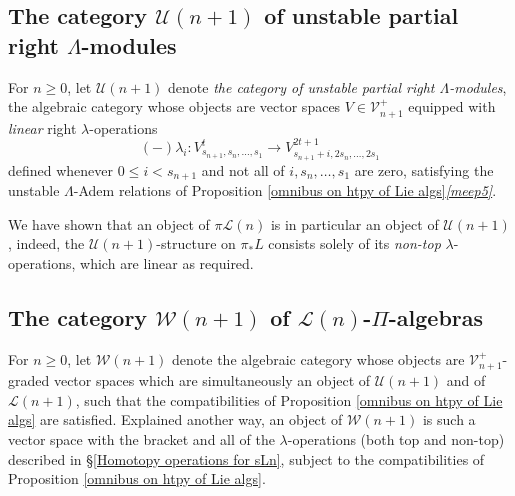 \documentclass[11pt]{amsart} \renewcommand{\baselinestretch}{1.2}
\theoremstyle{plain}
\newtheorem{prop}[thm]{Proposition}
\numberwithin{equation}{section} %
\theoremstyle{plain}
\newtheorem{prop}[thm]{Proposition}
\numberwithin{equation}{chapter} %
\newcommand{\DASH}{\mathrm{-}}
\renewcommand{\to}{\longrightarrow}
\newcommand{\calU}{\mathcal{U}}
\newcommand{\calL}{\mathcal{L}}
\newcommand{\calV}{\mathcal{V}}
\newcommand{\calw}{\mathcal{W}}
\newcommand{\vect}[2]{\calV^{#1}_{#2}}
\newcommand{\PA}[1]{\pi#1}
\newcommand{\SubsectionOrSection}[1]{\subsection{#1}}
\begin{document}
\begin{homotopy operations for PRLs}
\SubsectionOrSection{The category $\calU(n+1)$ of unstable partial right $\Lambda$-modules}
For $n\geq0$, let $\calU(n+1)$ denote \emph{the category  of unstable partial right $\Lambda$-modules}, the algebraic category whose objects are vector spaces $V\in \vect{+}{n+1}$ equipped with  \emph{linear} right $\lambda$-operations
\[(\DASH)\lambda_i:V_{s_{n+1},s_n,\ldots,s_1}^t\to V_{s_{n+1}+i,2s_n,\ldots,2s_1}^{2t+1}\]
defined whenever $0\leq i< s_{n+1}$ and not all of $i,s_{n},\ldots,s_{1}$ are zero, satisfying the unstable $\Lambda$-Adem relations of Proposition \ref{omnibus on htpy of Lie algs}\emph{\ref{meep5}}.

We have shown that an object of $\PA{\calL(n)}$ is in particular an object of $\calU(n+1)$, indeed, the $\calU(n+1)$-structure on $\pi_*L$ consists solely of its \emph{non-top} $\lambda$-operations, which are linear as required.
\SubsectionOrSection{The category $\calw(n+1)$ of $\calL(n)$-$\Pi$-algebras}
\label{wn+1 or pialgs section}
For $n\geq0$, let $\calw(n+1)$ denote %
the algebraic category whose objects are $\vect{+}{n+1}$-graded vector spaces which are simultaneously an object of $\calU(n+1)$ and of $\calL(n+1)$, such that the compatibilities of Proposition \ref{omnibus on htpy of Lie algs} are satisfied. Explained another way, an object of $\calw(n+1)$ is such a vector space with the bracket and all of the $\lambda$-operations (both top and non-top) described in \S\ref{Homotopy operations for sLn}, subject to the compatibilities of Proposition \ref{omnibus on htpy of Lie algs}.


\end{homotopy operations for PRLs}
\end{document}
